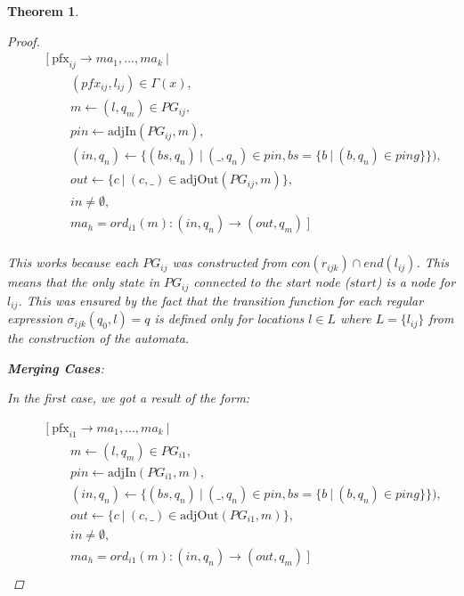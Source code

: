 \documentclass[twocolumn, openany]{sig-alternate-10pt}
\newcommand{\Pfx}{\mathrm{pfx}}%
\newtheorem{thm}{Theorem}
\begin{document}
\begin{thm}
\begin{proof}
 \[ \begin{array}{l}
     ~~~~~~~~~ [~ \Pfx_{ij} \rightarrow ma_1, \dots, ma_k ~\vert~ \\
     ~~~~~~~~~~~~~~~~~~ (pfx_{ij}, l_{ij}) \in \Gamma(x), \\
     ~~~~~~~~~~~~~~~~~~ m \leftarrow (l,q_m) \in PG_{ij}, \\
     ~~~~~~~~~~~~~~~~~~ pin \leftarrow \text{adjIn}(PG_{ij},m), \\
     ~~~~~~~~~~~~~~~~~~ (in,q_n) \leftarrow \{ (bs,q_n) ~\vert~ (\_,q_n) \in pin, bs=\{ b ~\vert~ (b,q_n) \in ping \} \}), \\
     ~~~~~~~~~~~~~~~~~~ out \leftarrow \{ c ~\vert~ (c,\_) \in \text{adjOut}(PG_{ij},m) \}, \\
     ~~~~~~~~~~~~~~~~~~ in \neq \emptyset, \\
     ~~~~~~~~~~~~~~~~~~ ma_h = ord_{i1}(m) : (in,q_n) \rightarrow (out,q_m) ~] \\
  \end{array} \]%

  This works because each $PG_{ij}$ was constructed from $con(r_{ijk}) \cap end(l_{ij})$. This means that the only state in $PG_{ij}$ connected to the start node ($\mathit{start}$) is a node for $l_{ij}$. This was ensured by the fact that the transition function for each regular expression $\sigma_{ijk}(q_0,l) = q$ is defined only for locations $l \in L$ where $L = \{ l_{ij} \}$ from the construction of the automata.

  \vspace{1em}
  \textbf{Merging Cases}:

  In the first case, we got a result of the form:

  \[ \begin{array}{l}
     ~~~~~~~~~ [~ \Pfx_{i1} \rightarrow ma_1, \dots, ma_k ~\vert~ \\
     ~~~~~~~~~~~~~~~~~~ m \leftarrow (l,q_m) \in PG_{i1}, \\
     ~~~~~~~~~~~~~~~~~~ pin \leftarrow \text{adjIn}(PG_{i1},m), \\
     ~~~~~~~~~~~~~~~~~~ (in,q_n) \leftarrow \{ (bs,q_n) ~\vert~ (\_,q_n) \in pin, bs=\{ b ~\vert~ (b,q_n) \in ping \} \}), \\
     ~~~~~~~~~~~~~~~~~~ out \leftarrow \{ c ~\vert~ (c,\_) \in \text{adjOut}(PG_{i1},m) \}, \\
     ~~~~~~~~~~~~~~~~~~ in \neq \emptyset, \\
     ~~~~~~~~~~~~~~~~~~ ma_h = ord_{i1}(m) : (in,q_n) \rightarrow (out,q_m) ~] \\
  \end{array} \]%


\end{proof}
\end{thm}
\end{document}
